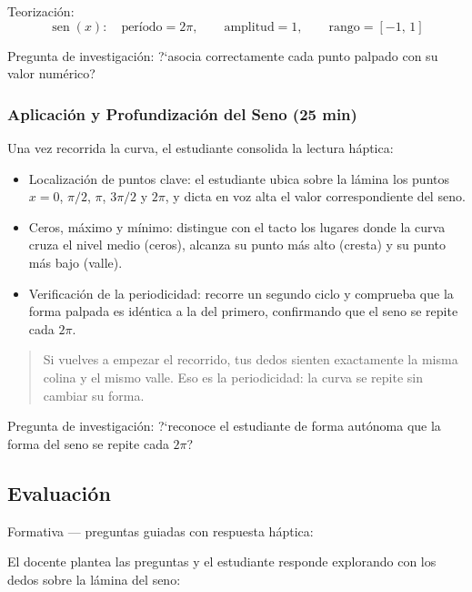\documentclass[14pt, a4paper]{extarticle}
\begin{document}
\vspace{6pt}
Teorizaci\'on:
\[
  \operatorname{sen}(x):\quad
  \text{per\'iodo}=2\pi, \qquad
  \text{amplitud}=1, \qquad
  \text{rango}=[-1,\,1]
\]

Pregunta de investigaci\'on: ?`asocia correctamente cada punto palpado con su
valor num\'erico?

\subsubsection*{Aplicaci\'on y Profundizaci\'on del Seno \normalfont(25 min)}

Una vez recorrida la curva, el estudiante consolida la lectura h\'aptica:

\begin{itemize}[itemsep=3pt]
  \item Localizaci\'on de puntos clave: el estudiante ubica sobre la l\'amina los
        puntos $x=0$, $\pi/2$, $\pi$, $3\pi/2$ y $2\pi$, y dicta en voz alta el
        valor correspondiente del seno.
  \item Ceros, m\'aximo y m\'inimo: distingue con el tacto los lugares donde la
        curva cruza el nivel medio (ceros), alcanza su punto m\'as alto (cresta)
        y su punto m\'as bajo (valle).
  \item Verificaci\'on de la periodicidad: recorre un segundo ciclo y comprueba
        que la forma palpada es id\'entica a la del primero, confirmando que el
        seno se repite cada $2\pi$.
\end{itemize}

\begin{quote}
Si vuelves a empezar el recorrido, tus dedos sienten exactamente la misma colina
y el mismo valle. Eso es la periodicidad: la curva se repite sin cambiar su
forma.
\end{quote}

Pregunta de investigaci\'on: ?`reconoce el estudiante de forma aut\'onoma que la
forma del seno se repite cada $2\pi$?

\subsection{Evaluaci\'on}

Formativa --- preguntas guiadas con respuesta h\'aptica:

El docente plantea las preguntas y el estudiante responde explorando con los
dedos sobre la l\'amina del seno:
\end{document}
